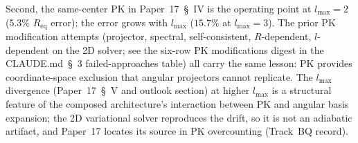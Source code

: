 \documentclass[11pt]{article}
\begin{document}
Second, the same-center PK in
Paper~17~\S~IV \cite{paper17} is the operating point at
$l_\text{max} = 2$ ($5.3\%$ $R_\text{eq}$ error); the error grows with
$l_\text{max}$ ($15.7\%$ at $l_\text{max} = 3$).  The prior PK
modification attempts (projector, spectral, self-consistent,
$R$-dependent, $l$-dependent on the 2D solver; see the
six-row PK modifications digest in the CLAUDE.md~\S~3
failed-approaches table) all carry the same lesson:
PK provides coordinate-space exclusion that angular projectors cannot
replicate.  The $l_\text{max}$ divergence (Paper~17~\S~V
and outlook section) at higher $l_\text{max}$ is a structural feature
of the composed architecture's interaction between PK and angular
basis expansion; the 2D variational solver reproduces the drift, so
it is not an adiabatic artifact, and Paper~17 locates its source in PK
overcounting (Track~BQ record).
\end{document}
